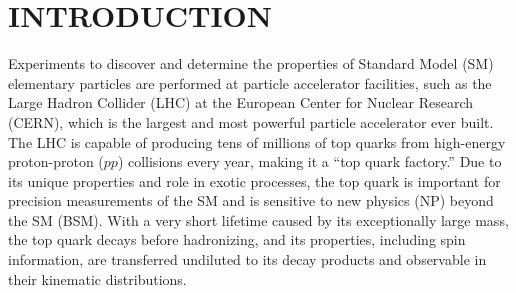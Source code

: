 
\chapter*{INTRODUCTION}
\label{Introduction}
Experiments to discover and determine the properties of Standard Model (SM) elementary particles are performed at particle accelerator facilities, such as the Large Hadron Collider (LHC) at the European Center for Nuclear Research (CERN), which is the largest and most powerful particle accelerator ever built.
The LHC is capable of producing tens of millions of top quarks from high-energy proton-proton ($pp$) collisions every year, making it a ``top quark factory.''
Due to its unique properties and role in exotic processes, the top quark is important for precision measurements of the SM and is sensitive to new physics (NP) beyond the SM (BSM).
With a very short lifetime caused by its exceptionally large mass, the top quark decays before hadronizing, and its properties, including spin information, are transferred undiluted to its decay products and observable in their kinematic distributions.

